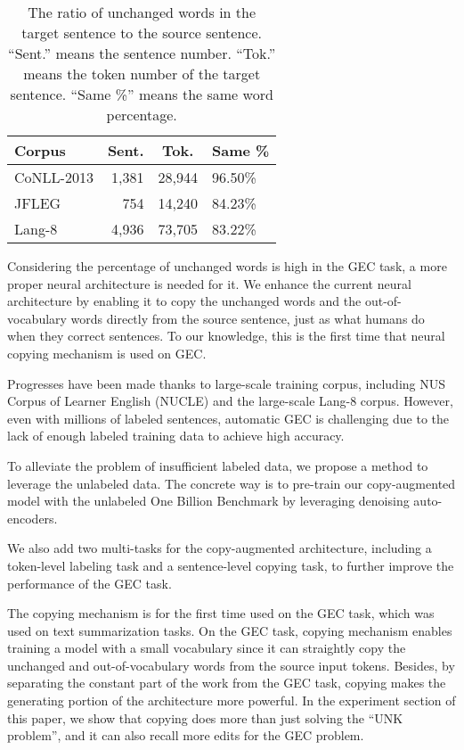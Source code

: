 \documentclass[11pt,a4paper]{article}
\begin{document}
\begin{table}[t!]
\begin{center}
\begin{tabular}{|l|r|c|l|}
\hline \bf Corpus & \bf Sent. & \bf Tok. & \bf Same \% \\ \hline
CoNLL-2013 & 1,381 & 28,944 & 96.50\% \\
JFLEG & 754 & 14,240 & 84.23\% \\
Lang-8 & 4,936 & 73,705 & 83.22\% \\
\hline
\end{tabular}
\end{center}
\caption{\label{copy_per} The ratio of unchanged words in the target sentence to the source sentence. ``Sent.'' means the sentence number. ``Tok.'' means the token number of the target sentence. ``Same \%'' means the same word percentage.}
\end{table}

Considering the percentage of unchanged words is high in the GEC task, a more proper neural architecture is needed for it. We enhance the current neural architecture by enabling it to copy the unchanged words and the out-of-vocabulary words directly from the source sentence, just as what humans do when they correct sentences. To our knowledge, this is the first time that neural copying mechanism is used on GEC.

Progresses have been made thanks to large-scale training corpus, including NUS Corpus of Learner English (NUCLE) \cite{dahlmeier2013building} and the large-scale Lang-8 corpus\cite{tajiri2012tense}. However, even with millions of labeled sentences, automatic GEC is challenging due to the lack of enough labeled training data to achieve high accuracy. 

To alleviate the problem of insufficient labeled data, we propose a method to leverage the unlabeled data. The concrete way is to pre-train our copy-augmented model with the unlabeled One Billion Benchmark \cite{chelba2013one} by leveraging denoising auto-encoders. 

We also add two multi-tasks for the copy-augmented architecture, including a token-level labeling task and a sentence-level copying task, to further improve the performance of the GEC task.

The copying mechanism is for the first time used on the GEC task, which was used on text summarization tasks. On the GEC task, copying mechanism enables training a model with a small vocabulary since it can straightly copy the unchanged and out-of-vocabulary words from the source input tokens. Besides, by separating the constant part of the work from the GEC task, copying makes the generating portion of the architecture more powerful. In the experiment section of this paper, we show that copying does more than just solving the ``UNK problem'', and it can also recall more edits for the GEC problem. 
\end{document}
